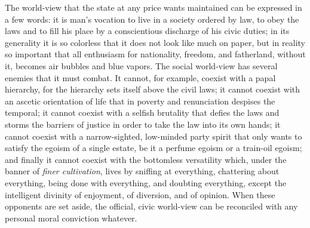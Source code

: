 \documentclass[12pt,a4paper,openany]{book}
\newcommand{\opage}[1]{\marginnote{\footnotesize\textit{[#1]}}}
\begin{document}
The world-view that the state at any price
wants maintained can be expressed in a few words: it is man's
vocation to live in a society ordered by law,
to obey the laws and to fill his place by a conscientious
discharge of his civic duties; in its generality it is
so colorless that it does not look like much on
paper, but in reality so important that all enthusiasm
for nationality, freedom, and fatherland, without it, becomes
air bubbles and blue vapors. The social world-view
has several enemies that it must combat. It cannot, for example,
coexist with a papal hierarchy, for the hierarchy sets
itself above the civil laws; it cannot coexist
with an ascetic orientation of life that in poverty and renunciation
despises the temporal; it cannot coexist with a selfish
brutality that defies the laws and storms the barriers
of justice in order to take the law into its own hands; it cannot
coexist with a narrow-sighted, low-minded party spirit that only
wants to satisfy the egoism of a single estate, be it a perfume egoism
or a train-oil egoism; and finally it cannot coexist
with the bottomless versatility which, under the banner of
\emph{finer cultivation}, lives by sniffing at everything, chattering about
everything, being done with everything, and doubting everything, except
the intelligent divinity of enjoyment, of diversion, and of opinion.
When these opponents are set aside, the
\setcounter{footnote}{0}%
\opage{7}official, civic world-view can be reconciled
with any personal moral conviction whatever.
\end{document}
